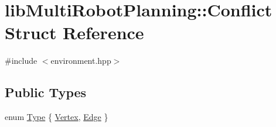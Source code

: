 \hypertarget{structlib_multi_robot_planning_1_1_conflict}{}\section{lib\+Multi\+Robot\+Planning\+:\+:Conflict Struct Reference}
\label{structlib_multi_robot_planning_1_1_conflict}


{\ttfamily \#include $<$environment.\+hpp$>$}

\subsection*{Public Types}
\begin{DoxyCompactItemize}
\item 
enum \hyperlink{structlib_multi_robot_planning_1_1_conflict_a3296f220687e49565bb9b551140d5904}{Type} \{ \hyperlink{structlib_multi_robot_planning_1_1_conflict_a3296f220687e49565bb9b551140d5904a87317dee2845549dc29f55c46d23b6dc}{Vertex}, 
\hyperlink{structlib_multi_robot_planning_1_1_conflict_a3296f220687e49565bb9b551140d5904a4728181e728582a2106b599737d4016f}{Edge}
 \}
\end{DoxyCompactItemize}
